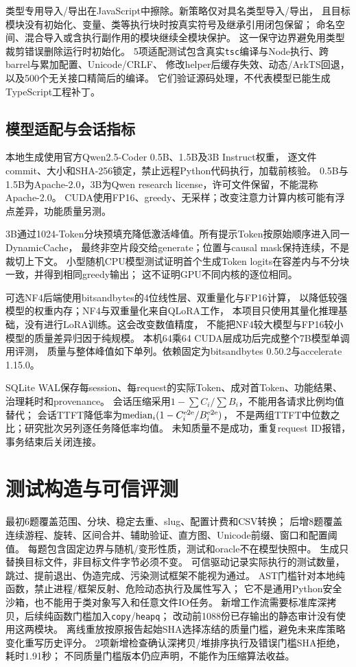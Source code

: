 \documentclass[UTF8,a4paper,11pt,fontset=fandol]{ctexart}
\begin{document}
类型专用导入/导出在JavaScript中擦除\cite{tsmodules}。新策略仅对具名类型导入/导出，
且目标模块没有初始化、变量、类等执行块时按真实符号及继承引用闭包保留；
命名空间、混合导入或含执行副作用的模块继续全模块保护。
这一保守边界避免用类型裁剪错误删除运行时初始化。
5项适配测试包含真实\texttt{tsc}编译与Node执行、跨barrel与累加配置、Unicode/CRLF、
修改helper后缓存失效、动态/ArkTS回退，以及500个无关接口精简后的编译。
它们验证源码处理，不代表模型已能生成TypeScript工程补丁。

\subsection{模型适配与会话指标}
本地生成使用官方Qwen2.5-Coder 0.5B、1.5B及3B Instruct权重\cite{qwen05,qwen15,qwen3}，
逐文件commit、大小和SHA-256锁定，禁止远程Python代码执行，加载前核验。
0.5B与1.5B为Apache-2.0，3B为Qwen research license，许可文件保留，不能混称Apache-2.0。
CUDA使用FP16、greedy、无采样；改变注意力计算内核可能有浮点差异，功能质量另测。

3B通过1024-Token分块预填充降低激活峰值。所有提示Token按原始顺序进入同一DynamicCache，
最终非空片段交给generate；位置与causal mask保持连续，不是裁切上下文。
小型随机CPU模型测试证明首个生成Token logits在容差内与不分块一致，并得到相同greedy输出；
这不证明GPU不同内核的逐位相同。

可选NF4后端使用bitsandbytes的4位线性层、双重量化与FP16计算，
以降低较强模型的权重内存\cite{qlora,bnb,quantdocs}；NF4与双重量化来自QLoRA工作，
本项目只使用其量化推理基础，没有进行LoRA训练。这会改变数值精度，
不能把NF4较大模型与FP16较小模型的质量差异归因于纯规模。
本机64乘64 CUDA层成功后完成整个7B模型单调用评测，
质量与整体峰值如下单列。依赖固定为bitsandbytes 0.50.2与accelerate 1.15.0。

SQLite WAL保存每session、每request的实际Token、成对首Token、功能结果、治理耗时和provenance。
会话压缩采用$1-\sum C_i/\sum B_i$，不能用各请求比例均值替代；
会话TTFT降低率为$\operatorname{median}_i(1-C_i^{\rm e2e}/B_i^{\rm e2e})$，
不是两组TTFT中位数之比；研究批次另列逐任务降低率均值。
未知质量不是成功，重复request ID报错，事务结束后关闭连接。

\section{测试构造与可信评测}
最初6题覆盖范围、分块、稳定去重、slug、配置计费和CSV转换；
后增8题覆盖连续游程、旋转、区间合并、辅助验证、直方图、Unicode前缀、窗口和配置阈值。
每题包含固定边界与随机/变形性质，测试和oracle不在模型快照中。
生成只替换目标文件，非目标文件字节必须不变。
可信驱动记录实际执行的测试数量，跳过、提前退出、伪造完成、污染测试框架不能视为通过。
AST门槛针对本地纯函数，禁止进程/框架反射、危险动态执行及属性写入；
它不是通用Python安全沙箱，也不能用于类对象写入和任意文件IO任务。
新增工作流需要标准库深拷贝，后续纯函数门槛加入\texttt{copy}/\texttt{heapq}；
改动前1088份已存输出的静态审计没有使用这两模块。
离线重放按原报告起始SHA选择冻结的质量门槛，避免未来库策略变化重写历史评分。
2项新增检查确认深拷贝/堆排序执行及错误门槛SHA拒绝，耗时1.91秒；
不同质量门槛版本仍应声明，不能作为压缩算法收益。
\end{document}
